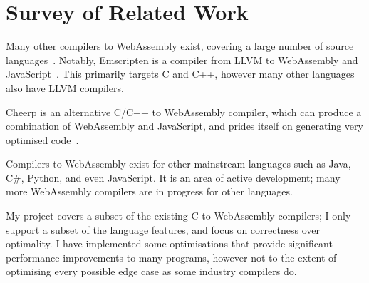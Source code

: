 \documentclass[00-main.tex]{subfiles}
\begin{document}
\section{Survey of Related Work}

Many other compilers to WebAssembly exist, covering a large number of source languages~.
Notably, Emscripten is a compiler from LLVM to WebAssembly and JavaScript~.
This primarily targets C and C++, however many other languages also have LLVM compilers.

Cheerp is an alternative C/C++ to WebAssembly compiler, which can produce a combination of WebAssembly and JavaScript, and prides itself on generating very optimised code~.

Compilers to WebAssembly exist for other mainstream languages such as Java, C\#, Python, and even JavaScript.
It is an area of active development; many more WebAssembly compilers are in progress for other languages.

My project covers a subset of the existing C to WebAssembly compilers; I only support a subset of the language features, and focus on correctness over optimality.
I have implemented some optimisations that provide significant performance improvements to many programs, however not to the extent of optimising every possible edge case as some industry compilers do.
\end{document}
